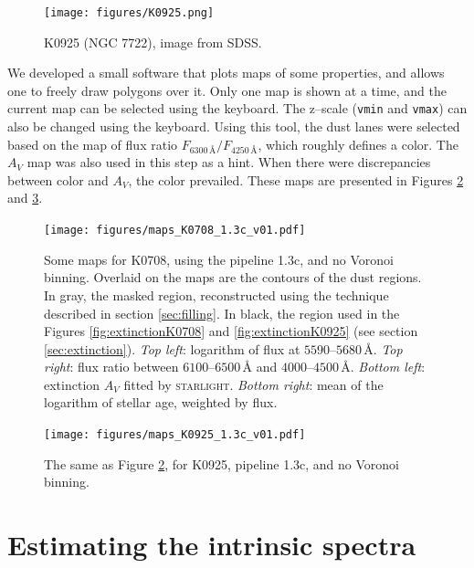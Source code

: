 \documentclass[a4paper]{article}
\newcommand{\angstrom}{\text{\AA}}
\def\starlight{\textsc{starlight}\xspace}
\begin{document}
\begin{figure}
\begin{center}
\texttt{[image: figures/K0925.png]}
\end{center}

\caption{K0925 (NGC 7722), image from SDSS.}
\label{fig:sdssK0925}
\end{figure}

We developed a small software that plots maps of some properties, and allows one
to freely draw polygons over it. Only one map is shown at a time, and the
current map can be selected using the keyboard. The z--scale (\texttt{vmin} and
\texttt{vmax}) can also be changed using the keyboard. Using this tool, the dust
lanes were selected based on the map of flux ratio $F_{6300\,\angstrom} /
F_{4250\,\angstrom}$, which roughly defines a color.
The $A_V$ map was also used in this step as a hint. When there were
discrepancies between color and $A_V$, the color prevailed. These maps are
presented in Figures \ref{fig:mapsK0708} and \ref{fig:mapsK0925}.

\begin{figure}
\texttt{[image: figures/maps\_K0708\_1.3c\_v01.pdf]}

\caption{Some maps for K0708, using the pipeline 1.3c, and no Voronoi binning.
Overlaid on the maps are the contours of the dust regions. In gray, the masked
region, reconstructed using the technique described in section
\ref{sec:filling}. In black, the region used in the Figures
\ref{fig:extinctionK0708} and \ref{fig:extinctionK0925} (see section
\ref{sec:extinction}). {\em Top left}: logarithm of flux at
$5590$--$5680\,\angstrom$. {\em Top right}: flux ratio between
$6100$--$6500\,\angstrom$ and $4000$--$4500\,\angstrom$. {\em Bottom left}:
extinction $A_V$ fitted by \starlight. {\em Bottom right}: mean of the logarithm
of stellar age, weighted by flux.}

\label{fig:mapsK0708}
\end{figure}

\begin{figure}
\texttt{[image: figures/maps\_K0925\_1.3c\_v01.pdf]}

\caption{The same as Figure \ref{fig:mapsK0708}, for K0925, pipeline 1.3c, and
no Voronoi binning.}
\label{fig:mapsK0925}
\end{figure}


\section{Estimating the intrinsic spectra}
\end{document}
